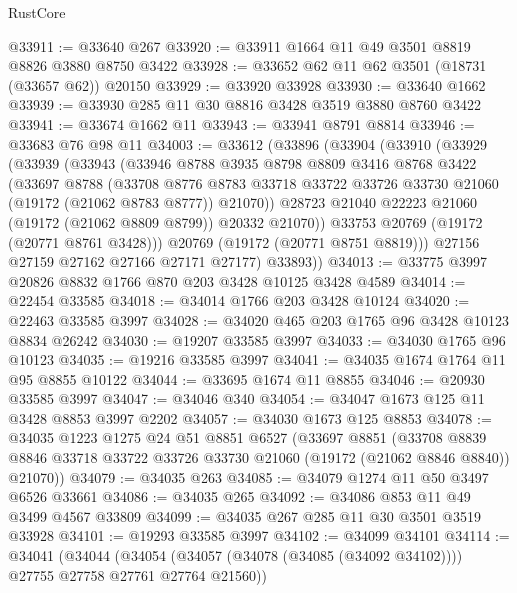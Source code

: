 \begin{lexlean}{RustCore}
\begin{coremodule}
@33911 := @33640 @267
@33920 := @33911 @1664 @11 @49 @3501 @8819 @8826 @3880 @8750 @3422
@33928 := @33652 @62 @11 @62 @3501 (@18731 (@33657 @62)) @20150
@33929 := @33920 @33928
@33930 := @33640 @1662
@33939 := @33930 @285 @11 @30 @8816 @3428 @3519 @3880 @8760 @3422
@33941 := @33674 @1662 @11
@33943 := @33941 @8791 @8814
@33946 := @33683 @76 @98 @11
@34003 := @33612
    (@33896
      (@33904
        (@33910
          (@33929
            (@33939
              (@33943
                (@33946
                  @8788
                  @3935
                  @8798
                  @8809
                  @3416
                  @8768
                  @3422
                  (@33697
                    @8788
                    (@33708
                      @8776
                      @8783
                      @33718
                      @33722
                      @33726
                      @33730
                      @21060
                      (@19172 (@21062 @8783 @8777))
                      @21070))
                  @28723
                  @21040
                  @22223
                  @21060
                  (@19172 (@21062 @8809 @8799))
                  @20332
                  @21070))
              @33753
              @20769
              (@19172 (@20771 @8761 @3428)))
            @20769
            (@19172 (@20771 @8751 @8819)))
          @27156
          @27159
          @27162
          @27166
          @27171
          @27177)
        @33893))
@34013 := @33775 @3997 @20826 @8832 @1766 @870 @203 @3428 @10125 @3428 @4589
@34014 := @22454 @33585
@34018 := @34014 @1766 @203 @3428 @10124
@34020 := @22463 @33585 @3997
@34028 := @34020 @465 @203 @1765 @96 @3428 @10123 @8834 @26242
@34030 := @19207 @33585 @3997
@34033 := @34030 @1765 @96 @10123
@34035 := @19216 @33585 @3997
@34041 := @34035 @1674 @1764 @11 @95 @8855 @10122
@34044 := @33695 @1674 @11 @8855
@34046 := @20930 @33585 @3997
@34047 := @34046 @340
@34054 := @34047 @1673 @125 @11 @3428 @8853 @3997 @2202
@34057 := @34030 @1673 @125 @8853
@34078 := @34035
    @1223
    @1275
    @24
    @51
    @8851
    @6527
    (@33697
      @8851
      (@33708 @8839 @8846 @33718 @33722 @33726 @33730 @21060 (@19172 (@21062 @8846 @8840)) @21070))
@34079 := @34035 @263
@34085 := @34079 @1274 @11 @50 @3497 @6526 @33661
@34086 := @34035 @265
@34092 := @34086 @853 @11 @49 @3499 @4567 @33809
@34099 := @34035 @267 @285 @11 @30 @3501 @3519 @33928
@34101 := @19293 @33585 @3997
@34102 := @34099 @34101
@34114 := @34041
    (@34044 (@34054 (@34057 (@34078 (@34085 (@34092 @34102)))) @27755 @27758 @27761 @27764 @21560))

\end{coremodule}
\end{lexlean}
